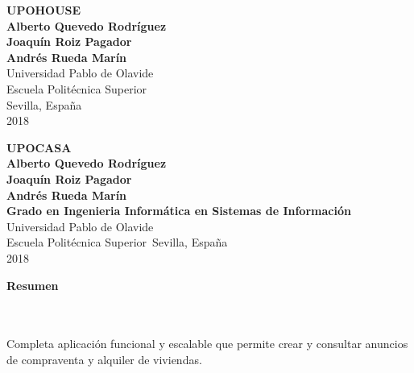\begin{center}
\begin{figure}
\centering%
%
\end{figure}
\begin{figure}
\centering%
%
\end{figure}
\thispagestyle{empty} \vspace*{2.0cm} \textbf{\huge
UPOHOUSE}\\[2.0cm]
\Large\textbf{Alberto Quevedo Rodr\'{i}guez\\Joaqu\'{i}n Roiz Pagador\\Andr\'{e}s Rueda Mar\'{i}n}\\[1.0cm]
\small Universidad Pablo de Olavide\\
Escuela Polit\'{e}cnica Superior\\
Sevilla, Espa\~{n}a\\
2018\\
\end{center}

\newpage{\pagestyle{empty}\cleardoublepage}

\newpage
\begin{center}
\thispagestyle{empty} \vspace*{0cm} \textbf{\huge
UPOCASA}\\[2.0cm]
\Large\textbf{Alberto Quevedo Rodr\'{i}guez\\Joaqu\'{i}n Roiz Pagador\\Andr\'{e}s Rueda Mar\'{i}n}\\[5.0cm]
\textbf{Grado en Ingenieria Inform\'{a}tica en Sistemas de Informaci\'{o}n}\\[4cm]
Universidad Pablo de Olavide\\
Escuela Polit\'{e}cnica Superior\
Sevilla, Espa\~{n}a\\
2018\\
\end{center}



\newpage{\pagestyle{empty}\cleardoublepage}

\newpage
\textbf{\LARGE Resumen}
\\\\
Completa aplicaci\'{o}n funcional y escalable que permite crear y consultar anuncios de compraventa y alquiler de viviendas.\\

